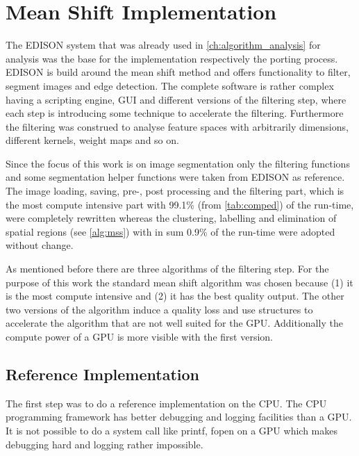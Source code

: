 \chapter{Mean Shift Implementation} %
\label{cha:implementation}

The \gls{EDISON} system that was already used in \autoref{ch:algorithm_analysis}
for analysis was the base for the implementation respectively the porting
process. \Gls{EDISON} is build around the mean shift method and offers
functionality to filter, segment images and edge detection. The complete
software is rather complex having a scripting engine, \gls{GUI} and different
versions of the filtering step, where each step is introducing some technique
to accelerate the filtering. Furthermore the filtering was construed to analyse
feature spaces with arbitrarily dimensions, different kernels, weight maps and 
so on. 

Since the focus of this work is on image segmentation only the filtering
functions and some segmentation helper functions were taken from \gls{EDISON} as
reference. The image loading, saving, pre-, post processing and the filtering
part, which is the most compute intensive part with 99.1\% (from
\autoref{tab:comped}) of the run-time, were completely rewritten whereas the
clustering, labelling and elimination of spatial regions (see \autoref{alg:mss})
with in sum 0.9\% of the run-time were adopted without change.

As mentioned before there are three algorithms of the filtering step. For the
purpose of this work the standard mean shift algorithm was chosen because (1)
it is the most compute intensive and (2) it has the best quality output. The other
two versions of the algorithm induce a quality loss and use structures to 
accelerate the algorithm that are not well suited for the \gls{GPU}. Additionally
the compute power of a \gls{GPU} is more visible with the first version. 

\section{Reference Implementation} %
\label{sec:reference_implementation}

The first step was to do a reference implementation on the \gls{CPU}. The
\gls{CPU} programming framework has better debugging and logging facilities
than a \gls{GPU}. It is not possible to do a system call like \textsf{printf}, 
\textsf{fopen} on a \gls{GPU} which makes debugging hard and logging rather 
impossible. 

